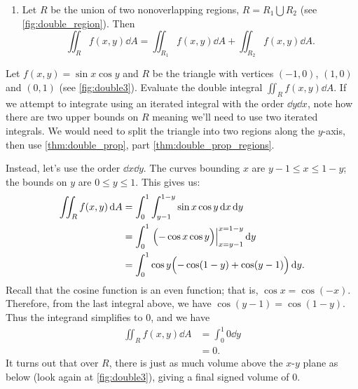 \begin{theorem}
\begin{enumerate}
{}
%
	\item \label{thm:double_prop_regions}	Let $R$ be the union of two nonoverlapping regions, $R = R_1\bigcup R_2$ (see \autoref{fig:double_region}). Then 
	\[\iint_R f(x,y)\dd A = \iint_{R_1}f(x,y)\dd A+ \iint_{R_2}f(x,y)\dd A.\]
\end{enumerate}
\end{theorem}

\begin{example}\label{ex_double3}%
Let $f(x,y) = \sin x\cos y$ and $R$ be the triangle with vertices $(-1,0)$, $(1,0)$ and $(0,1)$ (see \autoref{fig:double3}). Evaluate the double integral $\iint_Rf(x,y)\dd A$.
%
\solution
If we attempt to integrate using an iterated integral with the order $\dd y\dd x$, note how there are two upper bounds on $R$ meaning we'll need to use two iterated integrals. We would need to split the triangle into two regions along the $y$-axis, then use \autoref{thm:double_prop}, part \ref{thm:double_prop_regions}.

Instead, let's use the order $\dd x\dd y$. The curves bounding $x$ are $y-1\leq x\leq 1-y$; the bounds on $y$ are $0\leq y\leq 1$. This gives us:
\begin{align*}
\iint_R f(x,y)\operatorname{d}\! A &= \int_0^1\int_{y-1}^{1-y}\sin x\cos y\operatorname{d}\! x\operatorname{d}\! y\\
		&= \int_0^1\left.\Bigl( -\cos x\cos y\Bigr)\right|_{x=y-1}^{x=1-y}\operatorname{d}\! y\\
		&= \int_0^1 \cos y\Bigl(-\cos (1-y) + \cos(y-1)\Bigr)\operatorname{d}\! y.
\end{align*}
Recall that the cosine function is an even function; that is, $\cos x = \cos (-x)$. Therefore, from the last integral above, we have $\cos (y-1) = \cos (1-y)$. Thus the integrand simplifies to 0, and we have 
\begin{align*}
\iint_R f(x,y)\dd A &= \int_0^1 0\dd y \\
&= 0.
\end{align*}
It turns out that over $R$, there is just as much volume above the $x$-$y$ plane as below (look again at \autoref{fig:double3}), giving a final signed volume of 0.
\end{example}

